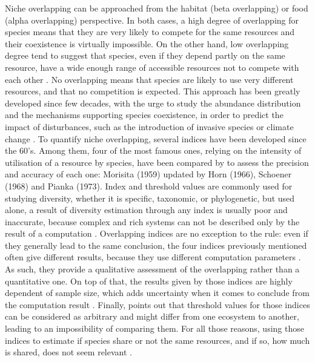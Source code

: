 \documentclass[a4paper, 12pt]{article}
\begin{document}
Niche overlapping can be approached from the habitat (beta overlapping) or food (alpha overlapping) perspective. In both cases, a high degree of overlapping for species means that they are very likely to compete for the same resources and their coexistence is virtually impossible. On the other hand, low overlapping degree tend to suggest that species, even if they depend partly on the same resource, have a wide enough range of accessible resources not to compete with each other \citep{mouillot2005}. No overlapping means that species are likely to use very different resources, and that no competition is expected. This approach has been greatly developed since few decades, with the urge to study the abundance distribution and the mechanisms supporting species coexistence, in order to predict the impact of disturbances, such as the introduction of invasive species or climate change \citep{albouy2011,geange2011, martini2020}. To quantify niche overlapping, several indices have been developed since the 60’s. Among them, four of the most famous ones, relying on the intensity of utilisation of a resource by species, have been compared by \citep{linton1981} to assess the precision and accuracy of each one: Morisita (1959) updated by Horn (1966), Schoener (1968) and Pianka (1973). Index and threshold values are commonly used for studying diversity, whether it is specific, taxonomic, or phylogenetic, but used alone, a result of diversity estimation through any index is usually poor and inaccurate, because complex and rich systems can not be described only by the result of a computation \citep{mejri2009}. Overlapping indices are no exception to the rule: even if they generally lead to the same conclusion, the four indices previously mentioned often give different results, because they use different computation parameters \citep{blondel1979}. As such, they provide a qualitative assessment of the overlapping rather than a quantitative one. On top of that, the results given by those indices are highly dependent of sample size, which adds uncertainty when it comes to conclude from the computation result \citep{linton1981}. Finally, \citep{grossman2009} points out that threshold values for those indices can be considered as arbitrary and might differ from one ecosystem to another, leading to an impossibility of comparing them. For all those reasons, using those indices to estimate if species share or not the same resources, and if so, how much is shared, does not seem relevant \citep{mouillot2005}.
\end{document}
